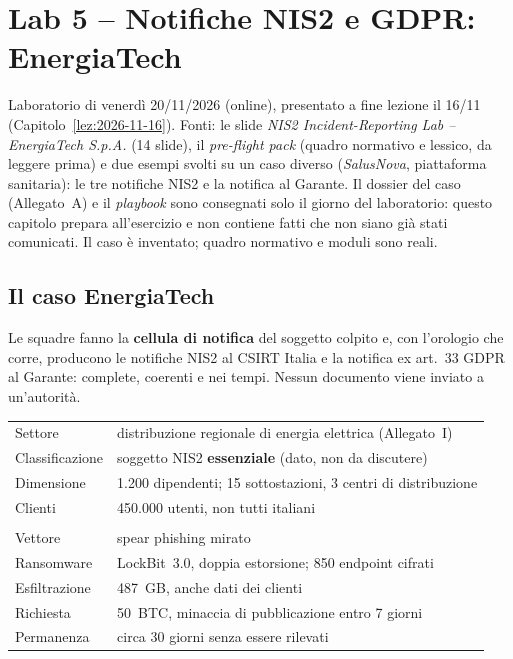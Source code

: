 \chapter{Lab 5 -- Notifiche NIS2 e GDPR: EnergiaTech}
\label{lab:05}

\begin{nota}[Fonte]
Laboratorio di venerdì 20/11/2026 (online), presentato a fine lezione il 16/11
(Capitolo~\ref{lez:2026-11-16}). Fonti: le slide \emph{NIS2 Incident-Reporting Lab -- EnergiaTech
S.p.A.} (14 slide), il \emph{pre-flight pack} (quadro normativo e lessico, da leggere prima) e due
esempi svolti su un caso diverso (\emph{SalusNova}, piattaforma sanitaria): le tre notifiche NIS2 e la
notifica al Garante. Il dossier del caso (Allegato~A) e il \emph{playbook} sono consegnati solo il
giorno del laboratorio: questo capitolo prepara all'esercizio e non contiene fatti che non siano già
stati comunicati. Il caso è inventato; quadro normativo e moduli sono reali.
\end{nota}

\section{Il caso EnergiaTech}

Le squadre fanno la \textbf{cellula di notifica} del soggetto colpito e, con l'orologio che corre,
producono le notifiche NIS2 al CSIRT Italia e la notifica ex art.~33 GDPR al Garante: complete, coerenti
e nei tempi. Nessun documento viene inviato a un'autorità.

\begin{center}
\small
\begin{tabularx}{\linewidth}{>{\raggedright\arraybackslash}p{3.2cm} X}
\toprule
\multicolumn{2}{l}{\textbf{Profilo}}\\
\midrule
Settore & distribuzione regionale di energia elettrica (Allegato~I)\\
Classificazione & soggetto NIS2 \textbf{essenziale} (dato, non da discutere)\\
Dimensione & 1.200 dipendenti; 15 sottostazioni, 3 centri di distribuzione\\
Clienti & 450.000 utenti, non tutti italiani\\
\midrule
\multicolumn{2}{l}{\textbf{Attacco}}\\
\midrule
Vettore & spear phishing mirato\\
Ransomware & LockBit~3.0, doppia estorsione; 850 endpoint cifrati\\
Esfiltrazione & 487~GB, anche dati dei clienti\\
Richiesta & 50~BTC, minaccia di pubblicazione entro 7 giorni\\
Permanenza & circa 30 giorni senza essere rilevati\\
\bottomrule
\end{tabularx}
\end{center}

